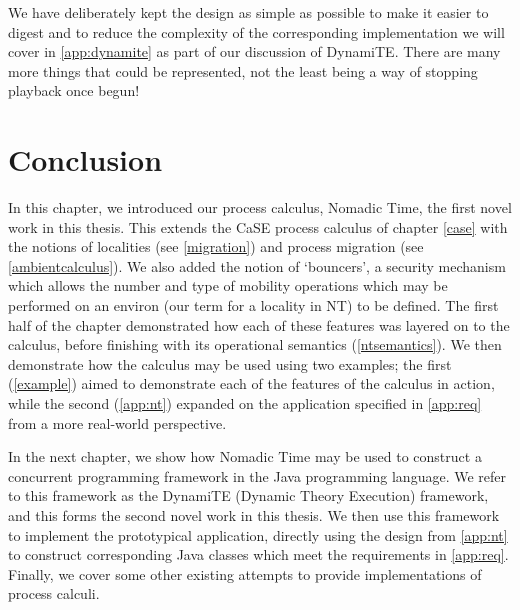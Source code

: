 We have deliberately kept the design as simple as possible to make it
easier to digest and to reduce the complexity of the corresponding
implementation we will cover in \ref{app:dynamite} as part of our
discussion of DynamiTE.  There are many more things that could be
represented, not the least being a way of stopping playback once
begun!

\section{Conclusion}

In this chapter, we introduced our process calculus, Nomadic Time, the
first novel work in this thesis.  This extends the CaSE process
calculus of chapter \ref{case} with the notions of localities (see
\ref{migration}) and process migration (see \ref{ambientcalculus}).
We also added the notion of `bouncers', a security mechanism which
allows the number and type of mobility operations which may be
performed on an environ (our term for a locality in NT) to be defined.
The first half of the chapter demonstrated how each of these features
was layered on to the calculus, before finishing with its operational
semantics (\ref{ntsemantics}).  We then demonstrate how the calculus
may be used using two examples; the first (\ref{example}) aimed to
demonstrate each of the features of the calculus in action, while the
second (\ref{app:nt}) expanded on the application specified in
\ref{app:req} from a more real-world perspective.

In the next chapter, we show how Nomadic Time may be used to construct
a concurrent programming framework in the Java programming language.
We refer to this framework as the DynamiTE (Dynamic Theory Execution)
framework, and this forms the second novel work in this thesis.  We
then use this framework to implement the prototypical application,
directly using the design from \ref{app:nt} to construct corresponding
Java classes which meet the requirements in \ref{app:req}.  Finally,
we cover some other existing attempts to provide implementations of
process calculi.
